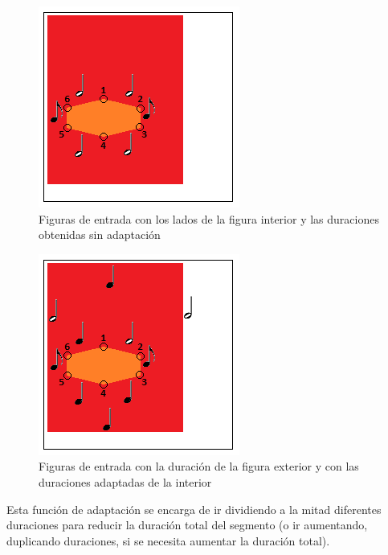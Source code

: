  		\begin{figure}[htbp]
		\centering
		\hspace*{0.0in}
		\includegraphics[scale=1]{graphics/simpletest4-F2.png}
		\caption{Figuras de entrada con los lados de la figura interior y las duraciones obtenidas sin adaptación}
		\label{fig:Figura1Voz2}
		\end{figure}

		\begin{figure}[htbp]
		\centering
		\hspace*{0.0in}
		\includegraphics[scale=1]{graphics/simpletest4-F2_2.png}
		\caption{Figuras de entrada con la duración de la figura exterior y con las duraciones adaptadas de la interior}
		\label{fig:Figura2Voz2}
		\end{figure}

Esta función de adaptación se encarga de ir dividiendo a la mitad diferentes duraciones para reducir la duración total del segmento (o ir aumentando, duplicando duraciones, si se necesita aumentar la duración total). 

